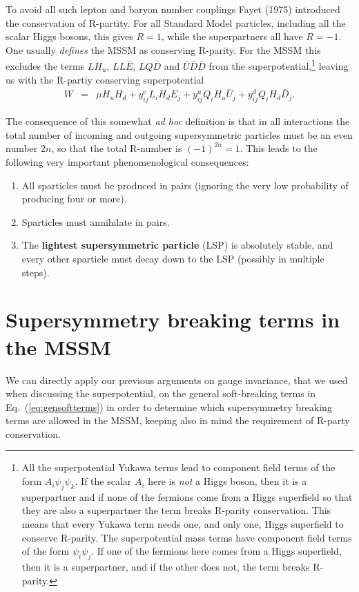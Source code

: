 \documentclass[notes.tex]{subfiles}
\begin{document}
To avoid all such lepton and baryon number couplings Fayet (1975) \cite{Fayet:1975ki} introduced the conservation of R-partity.
For all Standard Model particles, including all the scalar Higgs bosons, this gives $R=1$, while the superpartners all have $R=-1$. One usually {\it defines} the MSSM as conserving R-parity. For the MSSM this excludes the terms $L H_u$, $LL\bar{E}$, $LQ\bar{D}$ and $\bar{U}\bar{D} \bar{D}$ from the superpotential,\footnote{All the superpotential Yukawa terms lead to component field terms of the form $A_i\psi_j\psi_k$. If the scalar $A_i$ here is {\it not} a Higgs boson, then it is a superpartner and if none of the fermions come from a Higgs superfield so that they are also a superpartner the term breaks R-parity conservation. This means that every Yukawa term needs one, and only one, Higgs superfield to conserve R-parity.  The superpotential mass terms have component field terms of the form $\psi_i\psi_j$. If one of the fermions here comes from a Higgs superfield, then it is a superpartner, and if the other does not, the term breaks R-parity.}
leaving us with the R-partiy conserving superpotential
\begin{eqnarray}
W &=& \mu H_u H_d + y^e_{ij}L_iH_d E_j + y^u_{ij}Q_iH_u\bar{U}_j +  y^d_{ij}Q_iH_d\bar{D}_j.
\label{eq:RPCsuperpot}
\end{eqnarray}

The consequence of this somewhat {\it ad hoc} definition is that in all interactions the total number of incoming and outgoing supersymmetric particles must be an even number $2n$, so that the total R-number is $(-1)^{2n}=1$. This leads to the following very important phenomenological consequences:
\begin{enumerate}
\item All sparticles must be produced in pairs (ignoring the very low probability of producing four or more).
\item Sparticles must annihilate in pairs.
\item The {\bf lightest supersymmetric particle} (LSP) is absolutely stable, and every other sparticle must decay down to the LSP (possibly in multiple steps).
\end{enumerate}



\section{Supersymmetry breaking terms in the MSSM}
\label{sec:MSSM_soft_terms}
We can directly apply our previous arguments on gauge invariance, that we used when discussing the superpotential, on the general soft-breaking terms in Eq.~(\ref{eq:gensoftterms}) in order to determine which supersymmetry breaking terms are allowed in the MSSM, keeping also in mind the requirement of R-party conservation.
\end{document}
